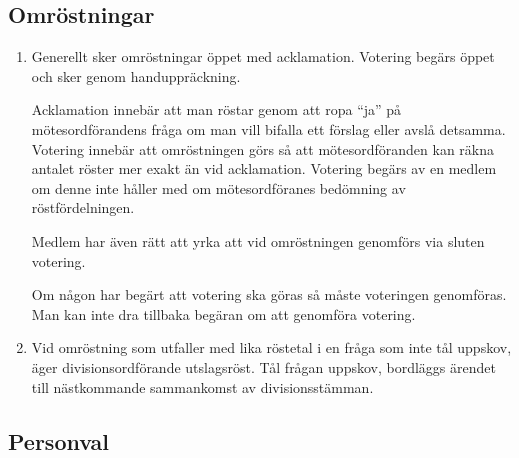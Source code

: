 \documentclass{dvd}
\begin{document}
\subsection{Omröstningar}

\begin{enumerate}[label=\arabic* §, ref=\arabic*]
	\item Generellt sker omröstningar öppet med acklamation.
	      Votering begärs öppet och sker genom handuppräckning.

	      Acklamation innebär att man röstar genom att ropa ``ja'' på mötesordförandens fråga om man vill bifalla ett förslag eller avslå detsamma.
	      Votering innebär att omröstningen görs så att mötesordföranden kan räkna antalet röster mer exakt än vid acklamation.
	      Votering begärs av en medlem om denne inte håller med om mötesordföranes bedömning av röstfördelningen.

	      Medlem har även rätt att yrka att vid omröstningen genomförs via sluten votering.

	      Om någon har begärt att votering ska göras så måste voteringen genomföras.
	      Man kan inte dra tillbaka begäran om att genomföra votering.

	\item Vid omröstning som utfaller med lika röstetal i en fråga som inte tål uppskov, äger divisionsordförande utslagsröst.
	      Tål frågan uppskov, bordläggs ärendet till nästkommande sammankomst av divisionsstämman.
\end{enumerate}

\subsection{Personval}
\end{document}
